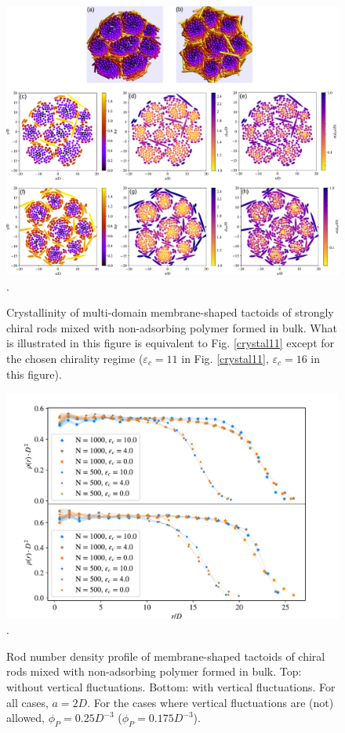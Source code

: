\begin{figure}
\begin{center}
\includegraphics[width= \columnwidth]{figures/chapter-5/crystallinity_16}.
	\caption{ \label{crystal16} Crystallinity of multi-domain membrane-shaped tactoids of strongly chiral rods mixed with non-adsorbing polymer formed in bulk. What is illustrated in this figure is equivalent to Fig. \ref{crystal11} except for the chosen chirality regime ($\varepsilon_c=11$ in Fig. \ref{crystal11}, $\varepsilon_c=16$ in this figure).}
\end{center}
\end{figure}


\begin{figure}
\begin{center}
\includegraphics[width= .9\columnwidth]{figures/chapter-5/density}.
	\caption{Rod number density profile of membrane-shaped tactoids of chiral rods mixed with non-adsorbing polymer formed in bulk. Top: without vertical fluctuations. Bottom: with vertical fluctuations. For all cases, $a = 2D$. For the cases where vertical fluctuations are (not) allowed, $\phi_P=0.25D^{-3}$ ($\phi_P=0.175D^{-3}$). } %
\end{center}
\end{figure}


